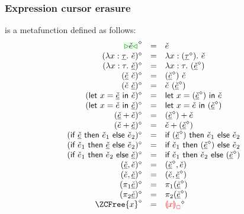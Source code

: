 \documentclass[formalism.tex]{subfiles}
\begin{document}
\subsubsection{Expression cursor erasure}
\label{sec:typed-expression-cursor-erasure}
\judgbox{\ensuremath{\cursorErase{\ZCMV}}} is a metafunction defined as follows:
%
\newcommand{\cursorErasesToRow}[2]{\ensuremath{\cursorErase{#1} & = & #2}}
\[\begin{array}{rcl}
  \cursorErasesToRow{\ZCCursor{\ECMV}}{\ECMV} \\
  \cursorErasesToRow{(\ZCLamT{x}{\ZTMV}{\ECMV})}{\ECLam{x}{(\cursorErase{\ZTMV})}{\ECMV}} \\
  \cursorErasesToRow{(\ZCLamE{x}{\TMV}{\ZCMV})}{\ECLam{x}{\TMV}{(\cursorErase{\ZCMV})}} \\
  \cursorErasesToRow{(\ZCApL{\ZCMV}{\ECMV})}{\ECAp{(\cursorErase{\ZCMV})}{\ECMV}} \\
  \cursorErasesToRow{(\ZCApR{\ECMV}{\ZCMV})}{\ECAp{\ECMV}{(\cursorErase{\ZCMV})}} \\
  \cursorErasesToRow{(\ZCLetL{x}{\ZCMV}{\ECMV})}{\ECLet{x}{(\cursorErase{\ZCMV})}{\ECMV}} \\
  \cursorErasesToRow{(\ZCLetR{x}{\ECMV}{\ZCMV})}{\ECLet{x}{\ECMV}{(\cursorErase{\ZCMV})}} \\
  \cursorErasesToRow{(\ZCPlusL{\ZCMV}{\ECMV})}{\ECPlus{(\cursorErase{\ZCMV})}{\ECMV}} \\
  \cursorErasesToRow{(\ZCPlusR{\ECMV}{\ZCMV})}{\ECPlus{\ECMV}{(\cursorErase{\ZCMV})}} \\
  \cursorErasesToRow{(\ZCIfC{\ZCMV}{\ECMV_1}{\ECMV_2})}{\ECIf{(\cursorErase{\ZCMV})}{\ECMV_1}{\ECMV_2}} \\
  \cursorErasesToRow{(\ZCIfL{\ECMV_1}{\ZCMV}{\ECMV_2})}{\ECIf{\ECMV_1}{(\cursorErase{\ZCMV})}{\ECMV_2}} \\
  \cursorErasesToRow{(\ZCIfL{\ECMV_1}{\ECMV_2}{\ZCMV})}{\ECIf{\ECMV_1}{\ECMV_2}{(\cursorErase{\ZCMV})}} \\
  \cursorErasesToRow{\ZCPairL{\ZCMV}{\ECMV}}{\ECPair{\cursorErase{\ZCMV}}{\ECMV}} \\
  \cursorErasesToRow{\ZCPairR{\ECMV}{\ZCMV}}{\ECPair{\ECMV}{\cursorErase{\ZCMV}}} \\
  \cursorErasesToRow{(\ZCProjL{\ZCMV})}{\ECProjL{(\cursorErase{\ZCMV})}} \\
  \cursorErasesToRow{(\ZCProjR{\ZCMV})}{\ECProjR{(\cursorErase{\ZCMV})}} \\
  \cursorErasesToRow{\ZCFree{x}}{\cursorErase{\ECFree{x}}} \\

\end{array}\]
\end{document}
